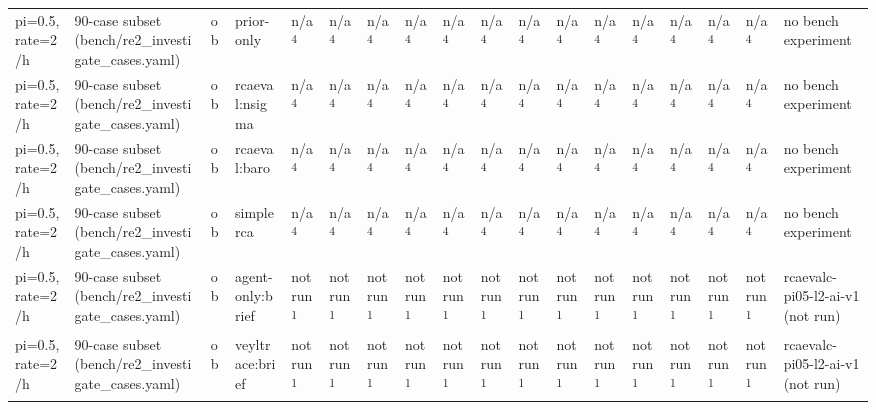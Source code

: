 \begin{table}[t]
\begin{tabular}{llllllllllllllllll}
pi=0.5, rate=2/h & 90-case subset (bench/re2\_investigate\_cases.yaml) & ob & prior-only & n/a\textsuperscript{4} & n/a\textsuperscript{4} & n/a\textsuperscript{4} & n/a\textsuperscript{4} & n/a\textsuperscript{4} & n/a\textsuperscript{4} & n/a\textsuperscript{4} & n/a\textsuperscript{4} & n/a\textsuperscript{4} & n/a\textsuperscript{4} & n/a\textsuperscript{4} & n/a\textsuperscript{4} & n/a\textsuperscript{4} & no bench experiment \\
pi=0.5, rate=2/h & 90-case subset (bench/re2\_investigate\_cases.yaml) & ob & rcaeval:nsigma & n/a\textsuperscript{4} & n/a\textsuperscript{4} & n/a\textsuperscript{4} & n/a\textsuperscript{4} & n/a\textsuperscript{4} & n/a\textsuperscript{4} & n/a\textsuperscript{4} & n/a\textsuperscript{4} & n/a\textsuperscript{4} & n/a\textsuperscript{4} & n/a\textsuperscript{4} & n/a\textsuperscript{4} & n/a\textsuperscript{4} & no bench experiment \\
pi=0.5, rate=2/h & 90-case subset (bench/re2\_investigate\_cases.yaml) & ob & rcaeval:baro & n/a\textsuperscript{4} & n/a\textsuperscript{4} & n/a\textsuperscript{4} & n/a\textsuperscript{4} & n/a\textsuperscript{4} & n/a\textsuperscript{4} & n/a\textsuperscript{4} & n/a\textsuperscript{4} & n/a\textsuperscript{4} & n/a\textsuperscript{4} & n/a\textsuperscript{4} & n/a\textsuperscript{4} & n/a\textsuperscript{4} & no bench experiment \\
pi=0.5, rate=2/h & 90-case subset (bench/re2\_investigate\_cases.yaml) & ob & simplerca & n/a\textsuperscript{4} & n/a\textsuperscript{4} & n/a\textsuperscript{4} & n/a\textsuperscript{4} & n/a\textsuperscript{4} & n/a\textsuperscript{4} & n/a\textsuperscript{4} & n/a\textsuperscript{4} & n/a\textsuperscript{4} & n/a\textsuperscript{4} & n/a\textsuperscript{4} & n/a\textsuperscript{4} & n/a\textsuperscript{4} & no bench experiment \\
pi=0.5, rate=2/h & 90-case subset (bench/re2\_investigate\_cases.yaml) & ob & agent-only:brief & not run\textsuperscript{1} & not run\textsuperscript{1} & not run\textsuperscript{1} & not run\textsuperscript{1} & not run\textsuperscript{1} & not run\textsuperscript{1} & not run\textsuperscript{1} & not run\textsuperscript{1} & not run\textsuperscript{1} & not run\textsuperscript{1} & not run\textsuperscript{1} & not run\textsuperscript{1} & not run\textsuperscript{1} & rcaevalc-pi05-l2-ai-v1 (not run) \\
pi=0.5, rate=2/h & 90-case subset (bench/re2\_investigate\_cases.yaml) & ob & veyltrace:brief & not run\textsuperscript{1} & not run\textsuperscript{1} & not run\textsuperscript{1} & not run\textsuperscript{1} & not run\textsuperscript{1} & not run\textsuperscript{1} & not run\textsuperscript{1} & not run\textsuperscript{1} & not run\textsuperscript{1} & not run\textsuperscript{1} & not run\textsuperscript{1} & not run\textsuperscript{1} & not run\textsuperscript{1} & rcaevalc-pi05-l2-ai-v1 (not run) \\

\end{tabular}
\end{table}
